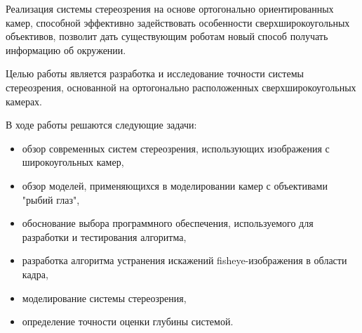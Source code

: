   Реализация системы стереозрения на основе ортогонально ориентированных камер, способной эффективно задействовать особенности 
  сверхширокоугольных объективов, позволит дать существующим роботам новый способ получать информацию об окружении.

Целью работы является разработка и исследование точности системы стереозрения, основанной на ортогонально расположенных сверхширокоугольных камерах.

В ходе работы решаются следующие задачи:
\begin{itemize}     %
    \item обзор современных систем стереозрения, использующих изображения с широкоугольных камер,
    \item обзор моделей, применяющихся в моделировании камер с объективами "рыбий глаз",
    \item обоснование выбора программного обеспечения, используемого для разработки и тестирования алгоритма, 
    \item разработка алгоритма устранения искажений fisheye-изображения в  области кадра, %
    \item моделирование системы  стереозрения,                                      
    \item определение точности оценки глубины системой.  
\end{itemize}


\clearpage